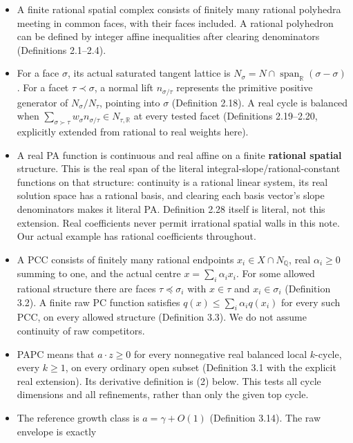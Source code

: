 \documentclass[
  10pt,
]{article}
\providecommand{\tightlist}{%
  \setlength{\itemsep}{0pt}\setlength{\parskip}{0pt}}
\begin{document}
\begin{itemize}
\tightlist
\item
  A finite rational spatial complex consists of finitely many rational
  polyhedra meeting in common faces, with their faces included. A
  rational polyhedron can be defined by integer affine inequalities
  after clearing denominators (Definitions 2.1--2.4).
\item
  For a face \(\sigma\), its actual saturated tangent lattice is
  \(N_\sigma=N\cap\operatorname{span}_{\mathbb{R}}(\sigma-\sigma)\). For
  a facet \(\tau\prec\sigma\), a normal lift \(n_{\sigma/\tau}\)
  represents the primitive positive generator of \(N_\sigma/N_\tau\),
  pointing into \(\sigma\) (Definition 2.18). A real cycle is balanced
  when
  \(\sum_{\sigma\succ\tau}w_\sigma n_{\sigma/\tau}\in N_{\tau,\mathbb{R}}\)
  at every tested facet (Definitions 2.19--2.20, explicitly extended
  from rational to real weights here).
\item
  A real PA function is continuous and real affine on a finite
  \textbf{rational spatial} structure. This is the real span of the
  literal integral-slope/rational-constant functions on that structure:
  continuity is a rational linear system, its real solution space has a
  rational basis, and clearing each basis vector's slope denominators
  makes it literal PA. Definition 2.28 itself is literal, not this
  extension. Real coefficients never permit irrational spatial walls in
  this note. Our actual example has rational coefficients throughout.
\item
  A PCC consists of finitely many rational endpoints
  \(x_i\in X\cap N_{\mathbb{Q}}\), real \(\alpha_i\geq0\) summing to one,
  and the actual centre \(x=\sum_i\alpha_i x_i\). For some allowed
  rational structure there are faces \(\tau\preceq\sigma_i\) with
  \(x\in\tau\) and \(x_i\in\sigma_i\) (Definition 3.2). A finite raw PC
  function satisfies \(q(x)\leq\sum_i\alpha_iq(x_i)\) for every such
  PCC, on every allowed structure (Definition 3.3). We do not assume
  continuity of raw competitors.
\item
  PAPC means that \(a\cdot z\geq0\) for every nonnegative real balanced
  local \(k\)-cycle, every \(k\geq1\), on every ordinary open subset
  (Definition 3.1 with the explicit real extension). Its derivative
  definition is (2) below. This tests all cycle dimensions and all
  refinements, rather than only the given top cycle.
\item
  The reference growth class is \(a=\gamma+O(1)\) (Definition 3.14). The
  raw envelope is exactly \[
\]
\end{itemize}
\end{document}
